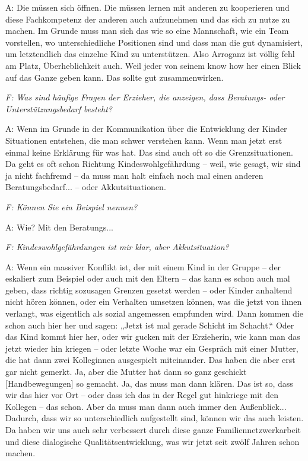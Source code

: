 \begin{linenumbers}
A: Die müssen sich öffnen. Die müssen lernen mit anderen zu kooperieren und diese Fachkompetenz der anderen auch aufzunehmen und das sich zu nutze zu machen. Im Grunde muss man sich das wie so eine Mannschaft, wie ein Team vorstellen, wo unterschiedliche Positionen sind und dass man die gut dynamisiert, um letztendlich das einzelne Kind zu unterstützen. Also Arroganz ist völlig fehl am Platz, Überheblichkeit auch. Weil jeder von seinem know how her einen Blick auf das Ganze geben kann. Das sollte gut zusammenwirken. 

\emph{F: Was sind häufige Fragen der Erzieher, die anzeigen, dass Beratungs- oder Unterstützungsbedarf besteht?}

A: Wenn im Grunde in der Kommunikation über die Entwicklung der Kinder Situationen entstehen, die man schwer verstehen kann. Wenn man jetzt erst einmal keine Erklärung für was hat. Das sind auch oft so die Grenzsituationen. Da geht es oft schon Richtung Kindeswohlgefährdung -- weil, wie gesagt, wir sind ja nicht fachfremd -- da muss man halt einfach noch mal einen anderen Beratungsbedarf... -- oder Akkutsituationen. 

\emph{F: Können Sie ein Beispiel nennen?}

A: Wie? Mit den Beratungs...

\emph{F: Kindeswohlgefährdungen ist mir klar, aber Akkutsituation?}

A: Wenn ein massiver Konflikt ist, der mit einem Kind in der Gruppe -- der eskaliert zum Beispiel oder auch mit den Eltern -- das kann es schon auch mal geben, dass richtig sozusagen Grenzen gesetzt werden -- oder Kinder anhaltend nicht hören können, oder ein Verhalten umsetzen können, was die jetzt von ihnen verlangt, was eigentlich als sozial angemessen empfunden wird. Dann kommen die schon auch hier her und sagen: „Jetzt ist mal gerade Schicht im Schacht.“ Oder das Kind kommt hier her, oder wir gucken mit der Erzieherin, wie kann man das jetzt wieder hin kriegen -- oder letzte Woche war ein Gespräch mit einer Mutter, die hat dann zwei Kolleginnen ausgespielt miteinander. Das haben die aber erst gar nicht gemerkt. Ja, aber die Mutter hat dann so ganz geschickt [Handbewegungen] so gemacht. Ja, das muss man dann klären. Das ist so, dass wir das hier vor Ort -- oder dass ich das in der Regel gut hinkriege mit den Kollegen -- das schon. Aber da muss man dann auch immer den Außenblick... Dadurch, dass wir so unterschiedlich aufgestellt sind, können wir das auch leisten. Da haben wir uns auch sehr verbessert durch diese ganze Familiennetzwerkarbeit und diese dialogische Qualitätsentwicklung, was wir jetzt seit zwölf Jahren schon machen. 


\end{linenumbers}
